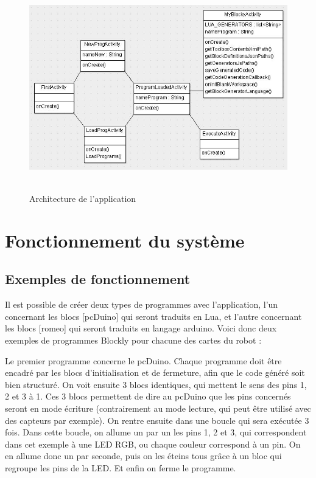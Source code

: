 \documentclass[12pt,francais]{report}
\begin{document}
\begin{figure}[!h]
\begin{addmargin}[-4em]{1em}
\includegraphics[scale=1.05]{./images/uml.jpg}~\\[1.5cm]
\caption{Architecture de l'application}
\end{addmargin}
\end{figure}

\newpage
\chapter*{Fonctionnement du système}

\section*{Exemples de fonctionnement}

Il est possible de créer deux types de programmes avec l'application, l'un concernant les blocs [pcDuino] qui seront traduits en Lua, et l'autre concernant les blocs [romeo] qui seront traduits en langage arduino.
Voici donc deux exemples de programmes Blockly pour chacune des cartes du robot :

\bigskip

Le premier programme concerne le pcDuino. Chaque programme doit être encadré par les blocs d'initialisation et de fermeture, afin que le code généré soit bien structuré. On voit ensuite 3 blocs identiques, qui mettent le sens des pins 1, 2 et 3 à 1. Ces 3 blocs permettent de dire au pcDuino que les pins concernés seront en mode écriture (contrairement au mode lecture, qui peut être utilisé avec des capteurs par exemple). On rentre ensuite dans une boucle qui sera exécutée 3 fois. Dans cette boucle, on allume un par un les pins 1, 2 et 3, qui correspondent dans cet exemple à une LED RGB, ou chaque couleur correspond à un pin. On en allume donc un par seconde, puis on les éteins tous grâce à un bloc qui regroupe les pins de la LED. Et enfin on ferme le programme.
\end{document}
